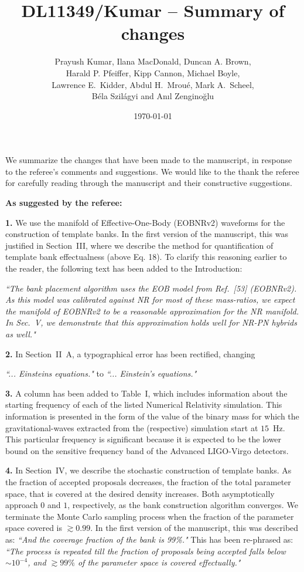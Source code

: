 \documentclass[a4paper,12pt]{article}
\title{DL11349/Kumar -- Summary of changes}
\author{Prayush Kumar, Ilana MacDonald, Duncan A. Brown,\\
Harald P. Pfeiffer, Kipp Cannon, Michael Boyle, \\
Lawrence E.~Kidder, Abdul H.~Mrou\'{e}, Mark A.~Scheel, \\
B\'{e}la Szil\'{a}gyi and An\i l Zengino\u{g}lu}
\date{\today}
\begin{document}
\maketitle

We summarize the changes that have been made to the manuscript, in response
to the referee's comments and suggestions. We would like to the thank the 
referee for carefully reading through the manuscript and their constructive
suggestions.
\newline

\textbf{As suggested by the referee:}
\newline


{\bf 1.} 
We use the manifold of Effective-One-Body (EOBNRv2) waveforms for 
the construction of template banks. In the first version of the 
manuscript, this was justified in Section~III, where we describe 
the method for quantification of template bank effectualness 
(above Eq. 18). To clarify this reasoning earlier to the reader, 
the following text has been added to the Introduction:

{\it ``The bank placement algorithm uses the EOB
model from Ref.~[53] (EOBNRv2). As this model was calibrated 
against NR for most of these mass-ratios, we expect
the manifold of EOBNRv2 to be a reasonable approximation 
for the NR manifold. In Sec.~V, we demonstrate that
this approximation holds well for NR-PN hybrids as well."}
\vspace{8pt}

{\bf 2.} 
In Section~II~A, a typographical error has been rectified, changing

\textit{``... Einsteins equations."} to {\it ``... Einstein's equations."}
\vspace{8pt}

{\bf 3.}
A column has been added to Table~I, which includes information about 
the starting frequency of each of the listed Numerical Relativity simulation.
This information is presented in the form of the value of the binary mass
for which the gravitational-waves extracted from the (respective) simulation
start at $15$~Hz. This particular frequency is significant because it 
is expected to be the lower bound on the sensitive frequency band of
the Advanced LIGO-Virgo detectors.
\vspace{8pt}

{\bf 4.} 
In Section~IV, we describe the stochastic construction of template 
banks. As the fraction of accepted proposals decreases, the fraction 
of the total parameter space, that is covered at the desired density 
increases. Both asymptotically approach $0$ and $1$, respectively, 
as the bank construction algorithm converges. We terminate 
the Monte Carlo sampling process when the fraction of the parameter 
space covered is $\gtrsim 0.99$. In the first version of the manuscript, 
this was described as: \textit{``And the coverage fraction of the bank is
99\%."} This has been re-phrased as: 
{\it ``The process is repeated till the fraction of 
proposals being accepted falls below $\sim 10^{-4}$, and $\gtrsim 99\%$
of the parameter space is covered effectually."}
\vspace{8pt}
\end{document}
